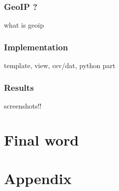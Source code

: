 \documentclass{koala-en}
\begin{document}
\subsection{GeoIP ?}
what is geoip
\subsection{Implementation}
template, view, csv/dat, python part
\subsection{Results}
screenshots!!

\chapter{Final word}

\thispagestyle{fancy}
\newpage

\chapter{Appendix}
\end{document}
